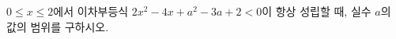 \hspace*{2mm}\begin{minipage}[t]{\dimexpr\linewidth-2mm\relax}\vspace{0pt}
$0\le x\le 2$에서 이차부등식 $2x^2-4x+a^2-3a+2<0$이 항상 성립할 때, 실수 $a$의 값의 범위를 구하시오.\end{minipage}
